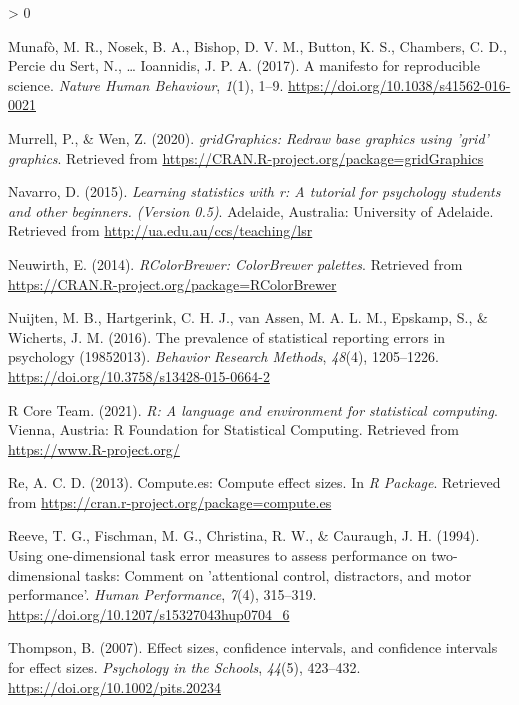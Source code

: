 \documentclass[
  english,
  man,floatsintext]{apa7}
\newlength{\cslhangindent}
\newenvironment{CSLReferences}[2] %
 {%
  \setlength{\parindent}{0pt}
  \ifodd #1 \everypar{\setlength{\hangindent}{\cslhangindent}}\ignorespaces\fi
  \ifnum #2 > 0
  \setlength{\parskip}{#2\baselineskip}
  \fi
 }%
 {}
\begin{document}
\begin{CSLReferences}{1}{0}
\leavevmode\hypertarget{ref-munafo2017}{}%
Munafò, M. R., Nosek, B. A., Bishop, D. V. M., Button, K. S., Chambers, C. D., Percie du Sert, N., \ldots{} Ioannidis, J. P. A. (2017). A manifesto for reproducible science. \emph{Nature Human Behaviour}, \emph{1}(1), 1--9. \url{https://doi.org/10.1038/s41562-016-0021}

\leavevmode\hypertarget{ref-R-gridGraphics}{}%
Murrell, P., \& Wen, Z. (2020). \emph{gridGraphics: Redraw base graphics using 'grid' graphics}. Retrieved from \url{https://CRAN.R-project.org/package=gridGraphics}

\leavevmode\hypertarget{ref-R-lsr}{}%
Navarro, D. (2015). \emph{Learning statistics with r: A tutorial for psychology students and other beginners. (Version 0.5)}. Adelaide, Australia: University of Adelaide. Retrieved from \url{http://ua.edu.au/ccs/teaching/lsr}

\leavevmode\hypertarget{ref-R-RColorBrewer}{}%
Neuwirth, E. (2014). \emph{RColorBrewer: ColorBrewer palettes}. Retrieved from \url{https://CRAN.R-project.org/package=RColorBrewer}

\leavevmode\hypertarget{ref-nuijten2016}{}%
Nuijten, M. B., Hartgerink, C. H. J., van Assen, M. A. L. M., Epskamp, S., \& Wicherts, J. M. (2016). The prevalence of statistical reporting errors in psychology (1985{{}}2013). \emph{Behavior Research Methods}, \emph{48}(4), 1205--1226. \url{https://doi.org/10.3758/s13428-015-0664-2}

\leavevmode\hypertarget{ref-R-base}{}%
R Core Team. (2021). \emph{R: A language and environment for statistical computing}. Vienna, Austria: R Foundation for Statistical Computing. Retrieved from \url{https://www.R-project.org/}

\leavevmode\hypertarget{ref-R-compute.es}{}%
Re, A. C. D. (2013). Compute.es: Compute effect sizes. In \emph{R Package}. Retrieved from \url{https://cran.r-project.org/package=compute.es}

\leavevmode\hypertarget{ref-reeve1994}{}%
Reeve, T. G., Fischman, M. G., Christina, R. W., \& Cauraugh, J. H. (1994). Using one-dimensional task error measures to assess performance on two-dimensional tasks: Comment on 'attentional control, distractors, and motor performance'. \emph{Human Performance}, \emph{7}(4), 315--319. \url{https://doi.org/10.1207/s15327043hup0704_6}

\leavevmode\hypertarget{ref-thompson2007}{}%
Thompson, B. (2007). Effect sizes, confidence intervals, and confidence intervals for effect sizes. \emph{Psychology in the Schools}, \emph{44}(5), 423--432. \url{https://doi.org/10.1002/pits.20234}


\end{CSLReferences}
\end{document}
